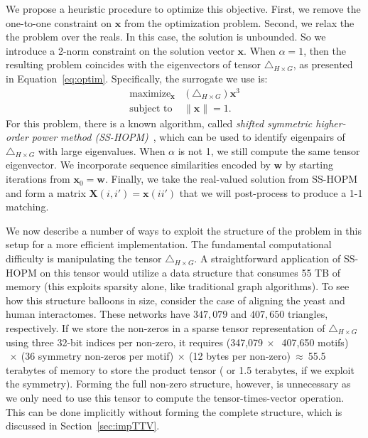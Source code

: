\documentclass[10pt, journal, compsoc, final]{IEEEtran}
\newcommand{\bs}[1]{\boldsymbol{#1}}
\newcommand{\Vector}[1]{\bs{#1}}
\newcommand{\Matrix}[1]{\mathbf{#1}}
\newcommand{\Tensor}[1]{\mathbf{\mathcal{#1}}}
\begin{document}
We propose a heuristic procedure to optimize this objective. 
First, we remove the one-to-one constraint on $\Vector{x}$ from the
optimization problem. Second, we relax the the problem over the reals. In this case, the solution is unbounded. So we introduce a 2-norm constraint on the solution vector $\Vector{x}$. When $\alpha = 1$, then the resulting problem coincides with the 
eigenvectors of tensor $\Tensor{\bigtriangleup}_{H \times G}$, as presented in 
Equation~\ref{eq:optim}.  Specifically, the surrogate we use is:
\begin{equation}
\label{eq:surrogate}
 \begin{array}{ll}
  \displaystyle \mathop{\text{maximize}}_{\Vector{x}} &  (\Tensor{\bigtriangleup}_{H \times G}) \Vector{x}^{3} \\
 \text{subject to} & \|\Vector{x}\| = 1.
 \end{array}
\end{equation}
For this problem, there is a known algorithm, called \textit{shifted 
symmetric higher-order power method (SS-HOPM)}~\cite{SSHOPM}, which can be used to identify eigenpairs of 
$\Tensor{\bigtriangleup}_{H \times G}$ with large eigenvalues. 
When $\alpha$ is not 1, we still compute the same tensor eigenvector.
We incorporate sequence similarities 
encoded by $\Vector{w}$ by starting iterations from $\Vector{x}_0 = \Vector{w}$.
Finally,
we take the real-valued solution from SS-HOPM and form a matrix 
$\Matrix{X}(i,i')=\Vector{x}(ii')$ that we will post-process to produce a 1-1 matching.

We now describe a number
of ways to exploit the structure of the problem in this setup for a more efficient implementation. The fundamental computational difficulty is manipulating the tensor
$\Tensor{\bigtriangleup}_{H \times G}$. A straightforward
application of SS-HOPM on this tensor would utilize a data structure that consumes
55 TB of memory (this exploits sparsity alone, like traditional graph algorithms). 
To see how this structure balloons in size, consider the case of aligning the yeast and 
human interactomes. These networks have $347,079$ and $407,650$ triangles, respectively.
If we store the non-zeros in a sparse tensor representation of $\Tensor{\bigtriangleup}_{H \times G}$ using three 32-bit
indices per non-zero, it requires (347,079$~\times~$ 407,650 motifs)$~\times~$(36 symmetry non-zeros per motif)$~\times~$(12 bytes per non-zero)$~\approx~$55.5 terabytes of memory to store the product tensor ( or 1.5$ \text{ terabytes}$, if we exploit the symmetry).
Forming the full non-zero structure, however, is unnecessary as we only need to use this tensor
to compute the tensor-times-vector operation. This can be done implicitly without
forming the complete structure, which is discussed in Section~\ref{sec:impTTV}.
\end{document}
